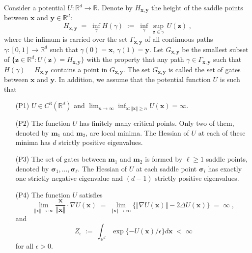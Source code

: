 \documentclass[reqno]{amsart}
\newcounter{as}[section]
\newcommand{\bb}[1]{{\mathbb #1}}
\newcommand{\bs}[1]{{\boldsymbol #1}}
\newcommand{\<}{\langle}
\renewcommand{\>}{\rangle}
\begin{document}
 Consider a potential $U: \bb R^d
\to \bb R$.  Denote by $H_{\bs x, \bs y}$ the height of the saddle
points between $\bs x$ and $\bs y\in\bb R^d$:
\begin{equation}
\label{2-5}
H_{\bs x, \bs y} \;=\; \inf_\gamma H(\gamma)
\;:=\; \inf_\gamma \, \sup_{\bs z \in \gamma} \, U(\bs z)\;,
\end{equation}
where the infimum is carried over the set $\Gamma_{\bs x, \bs y}$ of
all continuous paths $\gamma :[0,1]\to \bb R^d$ such that $\gamma(0) =
\bs x$, $\gamma(1) = \bs y$. Let $G_{\bs x, \bs y}$ be the smallest
subset of $\{\bs z\in\bb R^d : U(\bs z) = H_{\bs x, \bs y}\}$ with the
property that any path $\gamma \in \Gamma_{\bs x, \bs y}$ such that
$H(\gamma) = H_{\bs x, \bs y}$ contains a point in $G_{\bs x, \bs y}$.
The set $G_{\bs x, \bs y}$ is called the set of gates between $\bs x$
and $\bs y$. In addition, we assume that the potential function $U$ is such that
\begin{itemize}
\item[(P1)] $U\in C^{3}(\bb R^d)$ and
  $\lim_{n\rightarrow\infty} \inf_{\bs x : \Vert \bs x\Vert \ge n} U(\bs{x})=\infty$.

\item[(P2)] The function $U$ has finitely many critical points.  Only
  two of them, denoted by $\bs{m}_{1}$ and $\bs{m}_{2}$, are local
  minima.  The Hessian of $U$ at each of these minima has $d$ strictly
  positive eigenvalues.

\item[(P3)] The set of gates between $\bs{m}_{1}$ and $\bs{m}_{2}$ is
  formed by $\ell \ge1$ saddle points, denoted by $\bs{\sigma}_{1},
  \dots, \bs{\sigma}_{\ell}$. The Hessian of $U$ at each saddle point
  $\bs \sigma_i$ has exactly one strictly negative eigenvalue and
  $(d-1)$ strictly positive eigenvalues.

\item[(P4)] The function $U$ satisfies
\begin{equation}
\label{tight1}
\lim_{\Vert\bs{x}\Vert\rightarrow\infty}
\frac{\bs{x}}{\Vert\bs{x}\Vert}\cdot\nabla U(\bs{x})
\;=\;\lim_{\Vert\bs{x}\Vert\rightarrow\infty} \Big\{\Vert\nabla U(\bs{x})\Vert-
2\Delta U(\bs{x})\Big\} \;=\; \infty\;,
\end{equation}
and
\begin{equation*}
Z_{\epsilon}\;:=\;\int_{\bb R^d}\exp\{-U(\bs{x})/\epsilon\}d\bs{x}\;<\;\infty
\end{equation*}
for all $\epsilon>0$.
\end{itemize}
\end{document}
